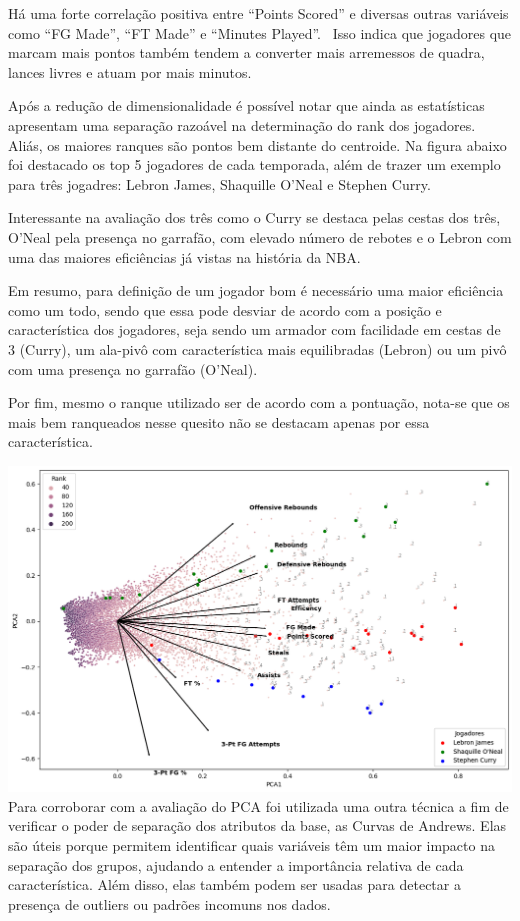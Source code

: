 \documentclass[
]{book}
\begin{document}
Há uma forte correlação positiva entre ``Points Scored'' e diversas outras variáveis como ``FG Made'', ``FT Made'' e ``Minutes Played''. ~Isso indica que jogadores que marcam mais pontos também tendem a converter mais arremessos de quadra, lances livres e atuam por mais minutos.

Após a redução de dimensionalidade é possível notar que ainda as estatísticas apresentam uma separação razoável na determinação do rank dos jogadores. Aliás, os maiores ranques são pontos bem distante do centroide. Na figura abaixo foi destacado os top 5 jogadores de cada temporada, além de trazer um exemplo para três jogadres: Lebron James, Shaquille O'Neal e Stephen Curry.

Interessante na avaliação dos três como o Curry se destaca pelas cestas dos três, O'Neal pela presença no garrafão, com elevado número de rebotes e o Lebron com uma das maiores eficiências já vistas na história da NBA.

Em resumo, para definição de um jogador bom é necessário uma maior eficiência como um todo, sendo que essa pode desviar de acordo com a posição e característica dos jogadores, seja sendo um armador com facilidade em cestas de 3 (Curry), um ala-pivô com característica mais equilibradas (Lebron) ou um pivô com uma presença no garrafão (O'Neal).

Por fim, mesmo o ranque utilizado ser de acordo com a pontuação, nota-se que os mais bem ranqueados nesse quesito não se destacam apenas por essa característica.

\includegraphics{imagens/6.png} Para corroborar com a avaliação do PCA foi utilizada uma outra técnica a fim de verificar o poder de separação dos atributos da base, as Curvas de Andrews. Elas são úteis porque permitem identificar quais variáveis têm um maior impacto na separação dos grupos, ajudando a entender a importância relativa de cada característica. Além disso, elas também podem ser usadas para detectar a presença de outliers ou padrões incomuns nos dados.
\end{document}
